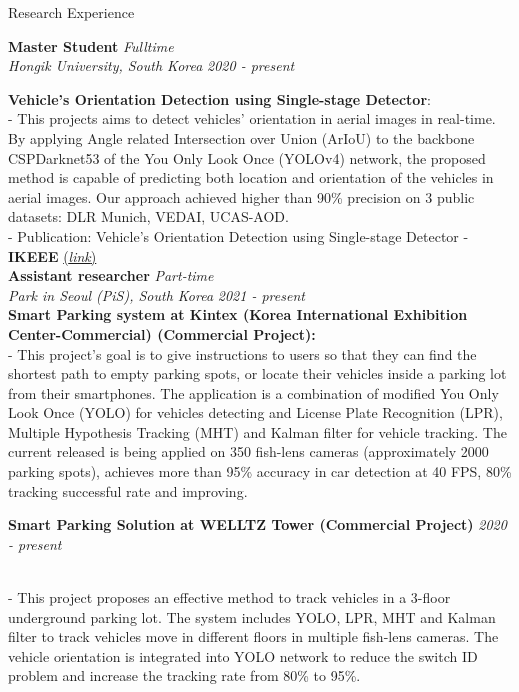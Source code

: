 \documentclass{resume} %
\begin{document}
\begin{rSection}{Research Experience}

{\bf Master Student} \hfill {\em Fulltime} 
\\{\textit{ Hongik University, South Korea}} \hfill {\em 2020 - present} 
\item \textbf{Vehicle's Orientation Detection using Single-stage Detector}: \\
- This projects aims to detect vehicles' orientation in aerial images in real-time. By applying Angle related Intersection over Union (ArIoU) to the backbone CSPDarknet53 of the You Only Look Once (YOLOv4) network, the proposed method is capable of predicting both location and orientation of the vehicles in aerial images. Our approach achieved higher than 90\% precision on 3 public datasets: DLR Munich, VEDAI, UCAS-AOD. \vspace{1.5mm}\\
- Publication: {\small Vehicle's Orientation Detection using Single-stage Detector - \textbf {IKEEE} \href{https://arxiv.org/pdf/2002.03894.pdf}{(\textit{link})}} \\

{\bf Assistant researcher} \hfill {\em Part-time} 
\\{\textit{Park in Seoul (PiS), South Korea}} \hfill {\em 2021 - present}
\\ \textbf{Smart Parking system at Kintex (Korea International Exhibition Center-Commercial) (Commercial Project):}
\\- This project's goal is to give instructions to users so that they can find the shortest path to empty parking spots, or locate their vehicles inside a parking lot from their smartphones. The application is a combination of modified You Only Look Once (YOLO) for vehicles detecting and License Plate Recognition (LPR), Multiple Hypothesis Tracking (MHT) and Kalman filter for vehicle tracking. The current released is being applied on 350 fish-lens cameras (approximately 2000 parking spots), achieves more than 95\% accuracy in car detection at 40 FPS, 80\% tracking successful rate and improving.

{\bf Smart Parking Solution at WELLTZ Tower (Commercial Project)} \hfill {\em 2020 - present} 

\\- This project proposes an effective method to track vehicles in a 3-floor underground parking lot. The system includes YOLO, LPR, MHT and Kalman filter to track vehicles move in different floors in multiple fish-lens cameras. The vehicle orientation is integrated into YOLO network to reduce the switch ID problem and increase the tracking rate from 80\% to 95\%.
\\\\\\


\end{rSection}
\end{document}
